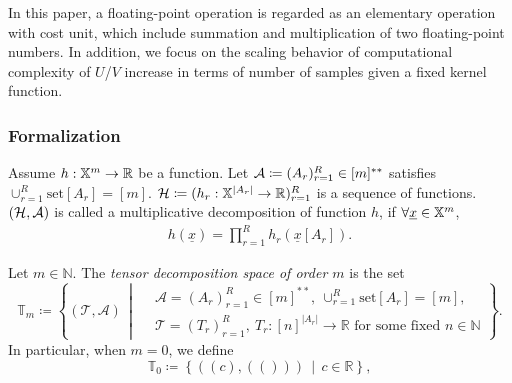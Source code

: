 \documentclass[letterpaper,11pt]{article}
\newcommand{\samplespace}{\bbX}
\newcommand{\takesetp}[1]{\mathrm{set}[#1]}
\newcommand{\mytensorspacep}[1]{\mathbb{T}_{#1}}
\begin{document}
\begin{bibunit}[plainnat]
In this paper, a floating-point operation is regarded as an elementary operation with cost unit, which include summation and multiplication of two floating-point numbers. In addition, we focus on the scaling behavior of  computational complexity of $U$/$V$ increase in terms of number of samples given a fixed kernel function.


\subsubsection{Formalization}
\label{subsubsec:computation_of_V_statistics_formalization}


\begin{definition}\label{def:multiplicative_decomposition}
Assume $h : \samplespace^m \to \reals$ be a function. Let ${\mathcal{A}} \coloneqq (A_r)_{r=1}^R \in [m]^{**}$ satisfies $\cup_{r=1}^R \takesetp{A_r} = [m]$. $\calH \coloneqq (h_r : \samplespace^{|A_r|} \to \reals)_{r=1}^R$ is a sequence of functions. $({\mathcal{H}}, {\mathcal{A}})$ is called a multiplicative decomposition of function $h$, if $\forall \underline{x} \in \samplespace^m$, 
\begin{align*}
    h(\underline{x}) = \prod_{r=1}^R h_r(\underline{x}[A_r]). 
\end{align*}
\end{definition}

\begin{definition}\label{def:tensor_decomp_space}
Let $m \in \mathbb{N}$. The \emph{tensor decomposition space of order $m$} is the set
\begin{equation}
\mytensorspacep{m} \coloneqq \left\{ (\mathcal{T}, \mathcal{A}) \,\middle|\, 
\begin{aligned}
    &\mathcal{A} = (A_r)_{r=1}^R \in [m]^{**},\ \cup_{r=1}^R \takesetp{A_r} = [m], \\
    &\mathcal{T} = (T_r)_{r=1}^R,\ T_r : [n]^{|A_r|} \to \mathbb{R} \text{ for some fixed } n \in \mathbb{N}
\end{aligned}
\right\}.
\end{equation}
In particular, when $m = 0$, we define
\begin{equation}
   \mytensorspacep{0} \coloneqq \left\{ ( ( c ), ( ( ) ) ) \,\middle|\, c \in \mathbb{R} \right\}, 
\end{equation}
\end{definition}


\end{bibunit}
\end{document}
